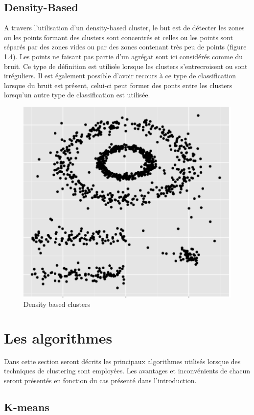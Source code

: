 \documentclass[memoire.tex]{subfiles}
\begin{document}
\subsection{Density-Based}
A travers l'utilisation d'un density-based cluster, le but est de détecter les zones ou les points formant des clusters sont concentrés et celles ou les points sont séparés par des zones vides ou par des zones contenant très peu de points (figure 1.4). Les points ne faisant pas partie d'un agrégat sont ici considérés comme du bruit. Ce type de définition est utilisée lorsque les clusters s'entrecroisent ou sont irréguliers.\cite{ref4} Il est également possible d'avoir recours à ce type de classification lorsque du bruit est présent, celui-ci peut former des ponts entre les clusters lorsqu'un autre type de classification est utilisée.
	\begin{figure}[h!]
		\centerline{\includegraphics[scale=0.8]{img/density_cluster.png}}
		\caption{Density based clusters}
	\end{figure}

\newpage
\section{Les algorithmes}
Dans cette section seront décrits les principaux algorithmes utilisés lorsque des techniques de clustering sont employées. Les avantages et inconvénients de chacun seront présentés en fonction du cas présenté dans l'introduction.
\subsection{K-means}
\end{document}
